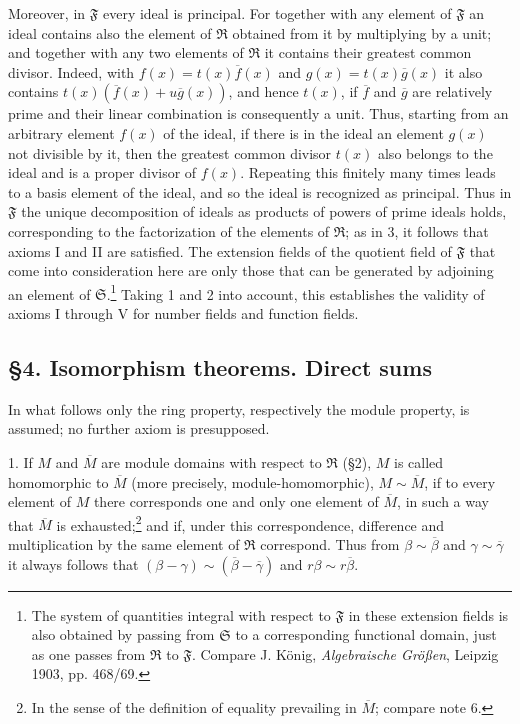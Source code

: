 \documentclass[11pt]{article}
\providecommand{\mR}{\mathfrak{R}}
\providecommand{\mS}{\mathfrak{S}}
\providecommand{\mF}{\mathfrak{F}}
\begin{document}
Moreover, in $\mF$ every ideal is principal. For together with any element of $\mF$ an ideal contains also the element of $\mR$ obtained from it by multiplying by a unit; and together with any two elements of $\mR$ it contains their greatest common divisor. Indeed, with $f(x)=t(x)\overline f(x)$ and $g(x)=t(x)\overline g(x)$ it also contains $t(x)(\overline f(x)+u\overline g(x))$, and hence $t(x)$, if $\overline f$ and $\overline g$ are relatively prime and their linear combination is consequently a unit. Thus, starting from an arbitrary element $f(x)$ of the ideal, if there is in the ideal an element $g(x)$ not divisible by it, then the greatest common divisor $t(x)$ also belongs to the ideal and is a proper divisor of $f(x)$. Repeating this finitely many times leads to a basis element of the ideal, and so the ideal is recognized as principal. Thus in $\mF$ the unique decomposition of ideals as products of powers of prime ideals holds, corresponding to the factorization of the elements of $\mR$; as in 3, it follows that axioms I and II are satisfied. The extension fields of the quotient field of $\mF$ that come into consideration here are only those that can be generated by adjoining an element of $\mS$.\footnote{The system of quantities integral with respect to $\mF$ in these extension fields is also obtained by passing from $\mS$ to a corresponding functional domain, just as one passes from $\mR$ to $\mF$. Compare J. König, \emph{Algebraische Größen}, Leipzig 1903, pp. 468/69.} Taking 1 and 2 into account, this establishes the validity of axioms I through V for number fields and function fields.

\subsection*{§4. Isomorphism theorems. Direct sums}

In what follows only the ring property, respectively the module property, is assumed; no further axiom is presupposed.

1. If $M$ and $\overline M$ are module domains with respect to $\mR$ (§2), $M$ is called homomorphic to $\overline M$ (more precisely, module-homomorphic), $M\sim\overline M$, if to every element of $M$ there corresponds one and only one element of $\overline M$, in such a way that $\overline M$ is exhausted;\footnote{In the sense of the definition of equality prevailing in $\overline M$; compare note 6.} and if, under this correspondence, difference and multiplication by the same element of $\mR$ correspond. Thus from $\beta\sim\overline\beta$ and $\gamma\sim\overline\gamma$ it always follows that $(\beta-\gamma)\sim(\overline\beta-\overline\gamma)$ and $r\beta\sim r\overline\beta$.
\end{document}
